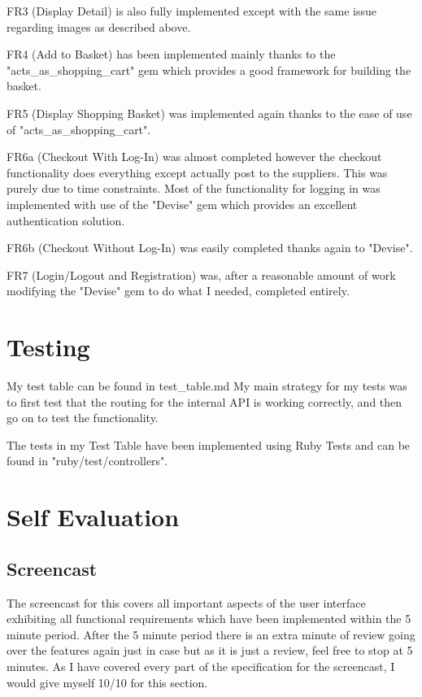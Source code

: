 \documentclass[11pt]{article}
\begin{document}
FR3 (Display Detail) is also fully implemented except with the same issue regarding images as described above.

FR4 (Add to Basket) has been implemented mainly thanks to the "acts\_as\_shopping\_cart" gem which provides a good framework for building the basket.

FR5 (Display Shopping Basket) was implemented again thanks to the ease of use of "acts\_as\_shopping\_cart".

FR6a (Checkout With Log-In) was almost completed however the checkout functionality does everything except actually post to the suppliers. This was purely due to time constraints. Most of the functionality for logging in was implemented with use of the "Devise" gem which provides an excellent authentication solution.

FR6b (Checkout Without Log-In) was easily completed thanks again to "Devise".

FR7 (Login/Logout and Registration) was, after a reasonable amount of work modifying the "Devise" gem to do what I needed, completed entirely.

\section{Testing}
My test table can be found in test\_table.md
My main strategy for my tests was to first test that the routing for the internal API is working correctly, and then go on to test the functionality.

The tests in my Test Table have been implemented using Ruby Tests and can be found in "ruby/test/controllers".

\section{Self Evaluation}
\subsection{Screencast}
The screencast for this covers all important aspects of the user interface exhibiting all functional requirements which have been implemented within the 5 minute period. After the 5 minute period there is an extra minute of review going over the features again just in case but as it is just a review, feel free to stop at 5 minutes.
As I have covered every part of the specification for the screencast, I would give myself 10/10 for this section.
\end{document}
